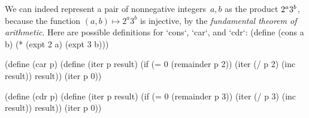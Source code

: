 We can indeed represent a pair of nonnegative integers~$a, b$ as the product $2^a 3^{\smash{b}}$, because the function $(a, b)\mapsto 2^a 3^b$ is injective, by the {\em fundamental theorem of arithmetic}. 
Here are possible definitions for `cons`, `car`, and `cdr`:
\begtt\scm
(define (cons a b)
  (* (expt 2 a) (expt 3 b)))

(define (car p)
  (define (iter p result)
    (if (= 0 (remainder p 2))
        (iter (/ p 2) (inc result))
        result))
  (iter p 0))

(define (cdr p)
  (define (iter p result)
    (if (= 0 (remainder p 3))
        (iter (/ p 3) (inc result))
        result))
  (iter p 0))
\endtt
